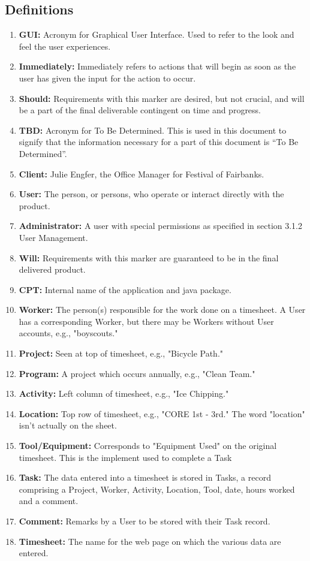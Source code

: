 \documentclass[12pt]{article}
\begin{document}
\subsection{Definitions}
\begin{enumerate}
\item \textbf{GUI:} Acronym for Graphical User Interface. Used to refer to the look and feel the user experiences.
\item \textbf{Immediately:} Immediately refers to actions that will begin as soon as the user has given the input for the action to occur.
\item \textbf{Should:} Requirements with this marker are desired, but not crucial, and will be a part of the final deliverable contingent on time and progress.
\item \textbf{TBD:} Acronym for To Be Determined. This is used in this document to signify that the information necessary for a part of this document is ``To Be Determined''.
\item \textbf{Client:} Julie Engfer, the Office Manager for Festival of Fairbanks.
\item \textbf{User:} The person, or persons, who operate or interact directly with the product.
\item \textbf{Administrator:} A user with special permissions as specified in section 3.1.2 User Management.
\item \textbf{Will:} Requirements with this marker are guaranteed to be in the final delivered product.
\item \textbf{CPT:} Internal name of the application and java package.
\item \textbf{Worker:} The person(s) responsible for the work done on a timesheet. A User has a corresponding Worker, but there may be Workers without User accounts, e.g., "boyscouts."
\item \textbf{Project:} Seen at top of timesheet, e.g., "Bicycle Path."
\item \textbf{Program:} A project which occurs annually, e.g., "Clean Team."
\item \textbf{Activity:} Left column of timesheet, e.g., "Ice Chipping."
\item \textbf{Location:} Top row of timesheet, e.g., "CORE 1st - 3rd." The word "location" isn't actually on the sheet.
\item \textbf{Tool/Equipment:} Corresponds to "Equipment Used" on the original timesheet. This is the implement used to complete a Task
\item \textbf{Task:} The data entered into a timesheet is stored in Tasks, a record comprising a Project, Worker, Activity, Location, Tool, date, hours worked and a comment.
\item \textbf{Comment:} Remarks by a User to be stored with their Task record.
\item \textbf{Timesheet:} The name for the web page on which the various data are entered.
\end{enumerate}
\end{document}
